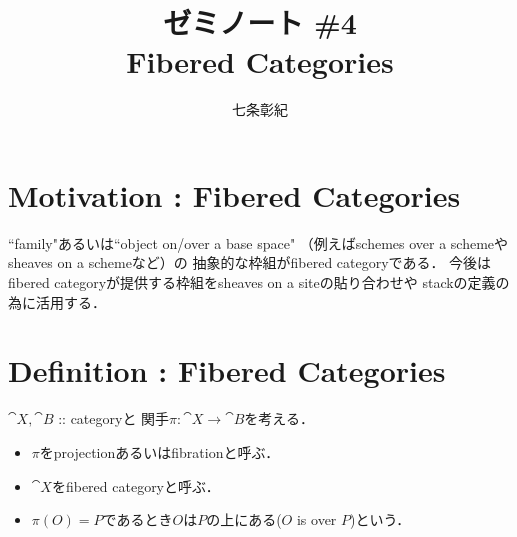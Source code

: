 \documentclass[a4paper, dvipdfmx]{jsarticle}
\begin{document}
\title{ゼミノート \#4 \\ Fibered Categories}
\author{七条彰紀}
\maketitle


\section{Motivation : Fibered Categories}
    ``family"あるいは``object on/over a base space"
    （例えばschemes over a schemeやsheaves on a schemeなど）の
    抽象的な枠組がfibered categoryである．
    今後はfibered categoryが提供する枠組をsheaves on a siteの貼り合わせや
    stackの定義の為に活用する．

\section{Definition : Fibered Categories}
    $\cat{X}, \cat{B}$ :: categoryと
    関手$\pi \colon \cat{X} \to \cat{B}$を考える．
    \begin{itemize}
    \item 
        $\pi$をprojectionあるいはfibrationと呼ぶ．
    \item
        $\cat{X}$をfibered categoryと呼ぶ．
    \item
        $\pi(O)=P$であるとき$O$は$P$の上にある($O$ is over $P$)という．
    \end{itemize}
\end{document}
